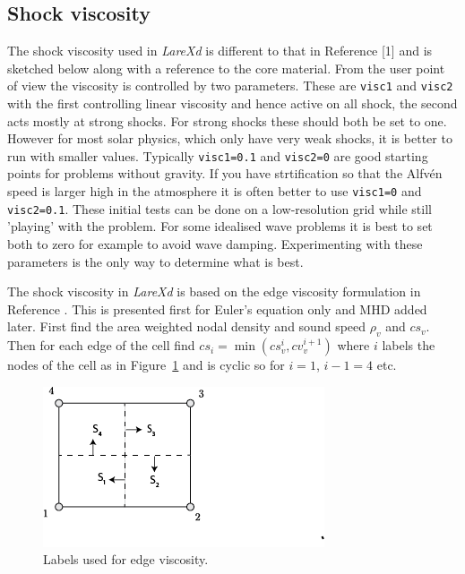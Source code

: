 \documentclass[11pt]{article}
\begin{document}
\subsection{Shock viscosity}
The shock viscosity used in {\it LareXd} is different to that in Reference [1] and is sketched below along
with a reference to the core material. From the user point of view the viscosity is controlled by two parameters.
These are \texttt{visc1} and \texttt{visc2} with the first controlling linear viscosity and hence active on all shock, the
second acts mostly at strong shocks. For strong shocks these should both be set to one. However for most solar physics,
which only have very weak shocks, it is better to run with smaller values. Typically \texttt{visc1=0.1} and \texttt{visc2=0}
are good starting points for problems without gravity. If you have strtification so that the Alfv\'en speed is larger
high in the atmosphere it is often better to use \texttt{visc1=0} and \texttt{visc2=0.1}.
These initial tests can be done on a low-resolution grid while still 'playing' with the problem. For some idealised wave
problems it is best to set both to zero for example to avoid wave damping. Experimenting with these parameters is the
only way to determine what is best.

The shock viscosity in {\it LareXd} is based on the edge viscosity formulation in Reference \cite{caramana}.
This is presented first for Euler's equation only and MHD added later.
First find the area weighted nodal density and sound speed $\rho_v$ and $cs_v$. Then for 
each edge of the cell find $cs_i=\min(cs_v^i,cv_v^{i+1})$ where $i$ labels the nodes of the cell
as in Figure~\ref{fig:larexd-grid} and is cyclic so for $i=1$, $i-1=4$ etc. 

\begin{figure}
  \centering
  \includegraphics[scale=0.8]{larexd-grid.png}
  \caption{Labels used for edge viscosity.}
  \label{fig:larexd-grid}
\end{figure} 
\end{document}
